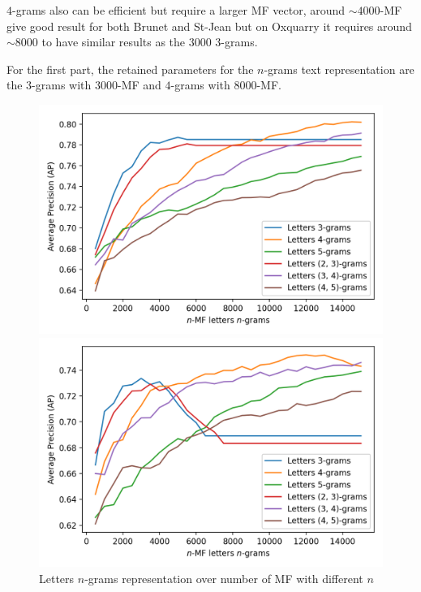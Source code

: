 $4$-grams also can be efficient but require a larger MF vector, around $\sim 4000$-MF give good result for both Brunet and St-Jean but on Oxquarry it requires around $\sim 8000$ to have similar results as the $3000$ $3$-grams.

For the first part, the retained parameters for the $n$-grams text representation are the $3$-grams with $3000$-MF and $4$-grams with $8000$-MF.

\begin{figure}[!t]
  \caption{Letters $n$-grams representation over number of MF with different $n$}
  \label{fig:letter_ngrams}

  \label{fig:letter_ngrams_oxquarry}
  \includegraphics[width=\linewidth]{img/letter_ngrams_oxquarry.png}

  \vspace{0.5cm}

  \label{fig:letter_ngrams_brunet}
  \includegraphics[width=\linewidth]{img/letter_ngrams_brunet.png}


\end{figure}
